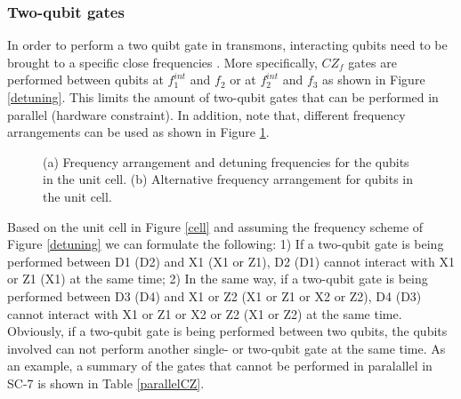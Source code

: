 \subsubsection*{Two-qubit gates}

In order to perform a two quibt gate in transmons, interacting qubits need to be brought to a specific close frequencies \cite{versluis2016scalable}. More specifically, $CZ_f$ gates are performed between qubits at $f^{int}_1$ and $f_2$ or at $f^{int}_2$ and $f_3$ as shown in Figure \ref{detuning}. This limits the amount of two-qubit gates that can be performed in parallel (hardware constraint). In addition, note that, different frequency arrangements can be used as shown in Figure \ref{sequence}. 


\begin{figure}[h!]
\centerline{
}
\caption{(a) Frequency arrangement and detuning frequencies for the qubits in the unit cell. (b) Alternative frequency arrangement for qubits in the unit cell.}
\label{sequence}
\end{figure}


Based on the unit cell in Figure \ref{cell} and assuming the frequency scheme of Figure \ref{detuning} we can formulate the following: 1) If a two-qubit gate is being performed between D1 (D2) and X1 (X1 or Z1), D2 (D1) cannot interact with X1 or Z1 (X1) at the same time; 2) In the same way, if a two-qubit gate is being performed between D3 (D4) and X1 or Z2 (X1 or Z1 or X2 or Z2), D4 (D3) cannot interact with X1 or Z1 or X2 or Z2 (X1 or Z2) at the same time. Obviously,  if a two-qubit gate is being performed between two qubits, the qubits involved can not perform another single- or two-qubit gate at the same time. As an example, a summary of the gates that cannot be performed in paralallel in SC-7 is shown in Table \ref{parallelCZ}.

